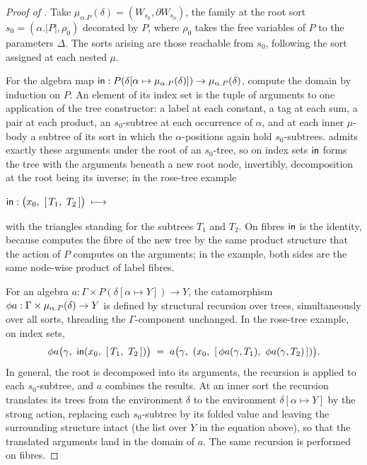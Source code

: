 \begin{proof}[Proof of ]
Take $\mu_{\alpha.P}(\delta) = (W_{s_0}, \partial W_{s_0})$, the family at the root sort $s_0 =
(\alpha.|P|, \rho_0)$ decorated by $P$, where $\rho_0$ takes the free variables of $P$ to the
parameters $\Delta$. The sorts arising are those reachable from $s_0$, following the sort assigned at
each nested $\mu$.

For the algebra map $\mathsf{in} : P(\delta[\alpha \mapsto \mu_{\alpha.P}(\delta)]) \to
\mu_{\alpha.P}(\delta)$, compute the domain by induction on $P$. An element of its index set is the
tuple of arguments to one application of the tree constructor: a label at each constant, a tag at each sum,
a pair at each product, an $s_0$-subtree at each occurrence of $\alpha$, and at each inner
$\mu$-body a subtree of its sort in which the $\alpha$-positions again hold $s_0$-subtrees.
 admits exactly these arguments under the root of an $s_0$-tree, so
on index sets $\mathsf{in}$ forms the tree with the arguments beneath a new root node, invertibly,
decomposition at the root being its inverse; in the rose-tree example
\begin{center}
$\mathsf{in} : \bigl(x_0,\ [\,T_1,\ T_2\,]\bigr) \;\longmapsto\;$
\end{center}
\noindent
with the triangles standing for the subtrees $T_1$ and $T_2$. On fibres $\mathsf{in}$ is the identity,
because  computes the fibre of the new tree by the same product
structure that the action of $P$ computes on the arguments; in the example, both sides are the same
node-wise product of label fibres.

For an algebra $a : \Gamma \times P(\delta[\alpha \mapsto Y]) \to Y$, the catamorphism
$\phi{a} : \Gamma \times \mu_{\alpha.P}(\delta) \to Y$ is defined by structural recursion over
trees, simultaneously over all sorts, threading the $\Gamma$-component unchanged. In the rose-tree
example, on index sets,
\[
  \cata{a}\bigl(\gamma,\ \inMap(x_0,\ [\,T_1,\ T_2\,])\bigr) \;=\;
  a\bigl(\gamma,\ (x_0,\ [\,\cata{a}(\gamma, T_1),\ \cata{a}(\gamma, T_2)\,])\bigr).
\]
\noindent
In general, the root is decomposed into its arguments, the recursion is applied to each
$s_0$-subtree, and $a$ combines the results. At an inner sort the recursion translates its trees from
the environment $\delta$ to the environment $\delta[\alpha \mapsto Y]$ by the strong action,
replacing each $s_0$-subtree by its folded value and leaving the surrounding structure intact (the
list over $Y$ in the equation above), so that the translated arguments land in the domain of $a$. The
same recursion is performed on fibres.


\end{proof}
